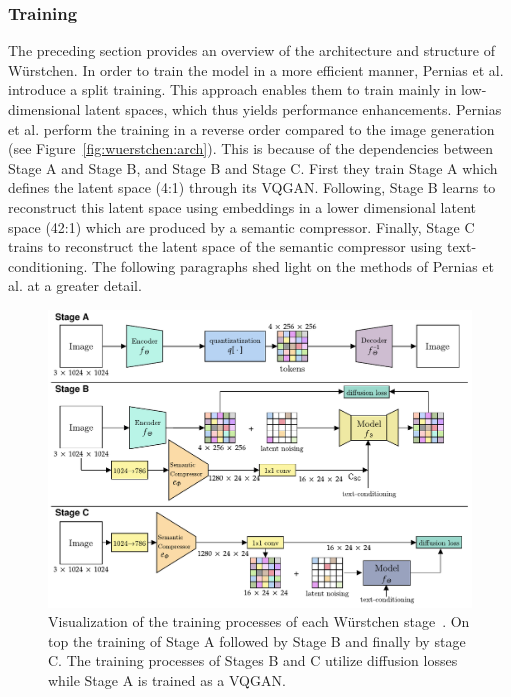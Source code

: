 \subsubsection{Training}
The preceding section provides an overview of the architecture and structure
of W\"urstchen.
In order to train the model in a more efficient manner, Pernias et
al.~\cite{pernias2024wrstchen} introduce a split training. This approach enables
them to train mainly in low-dimensional latent spaces, which thus yields
performance enhancements. Pernias et al. perform the training in a reverse order
compared to the image generation (see Figure~\ref{fig:wuerstchen:arch}). This is
because of the dependencies between Stage A and Stage B, and Stage B and Stage C.
First they train Stage A which defines the latent space (4:1) through its VQGAN.
Following, Stage B learns to reconstruct this latent space using embeddings in a
lower dimensional latent space (42:1) which are produced by a semantic compressor.
Finally, Stage C trains to reconstruct the latent space of the semantic
compressor using text-conditioning. The following paragraphs shed light on the methods
of Pernias et al. at a greater detail.

\begin{figure}[t]
    \includegraphics[width=\textwidth]{assets/wuerstchen_training.pdf}
    \caption{Visualization of the training processes of each W\"urstchen stage~\cite{pernias2024wrstchen}.
        On top the training of Stage A followed by Stage B and finally by stage C.
        The training processes of Stages B and C utilize diffusion losses while
        Stage A is trained as a VQGAN.}
    \label{fig:wuerstchen:training}
\end{figure}

